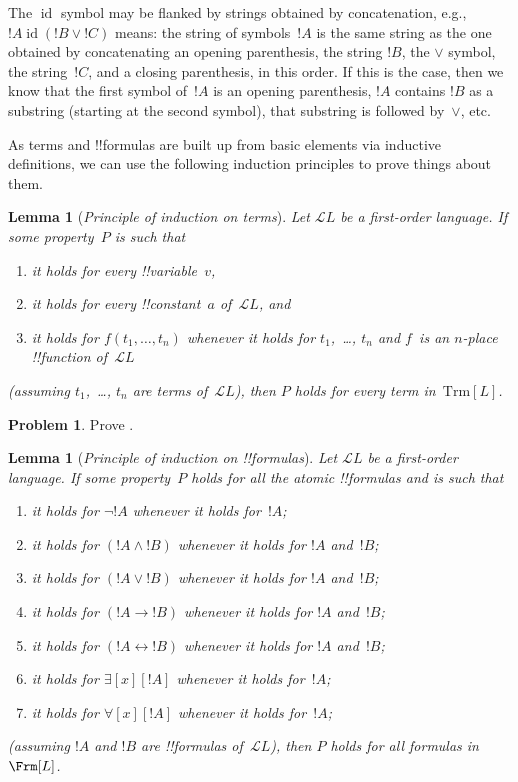 \documentclass[10pt,a4paper]{article}
\makeatletter
\theoremstyle{plain}
\newtheorem{lem}[thm]{Lemma}
\theoremstyle{definition}
\newtheorem{prob}{Problem}[section]
\theoremstyle{remark}
\newcommand*{\ollabel}[1]{\label{#1}}
\newcommand{\olref}{\@ifnextchar[{\olref@i}{\olref@final}}
\def\olref@i[#1]{\@ifnextchar[{\olref@ii}{\olref@final}}
\def\olref@ii[#1]{\@ifnextchar[{\olref@iii}{\olref@final}}
\def\olref@iii[#1]{\olref@final}
\def\olref@final#1{\ref{#1}}
\providecommand{\lif}{\mathbin{\rightarrow}}
\providecommand{\lforall}{\mathord{\forall}}
\providecommand{\lexists}{\mathord{\exists}}
\providecommand{\Lang}{\ensuremath{\mathcal{L}}}
\providecommand{\tagitem}[1]{\item[#1]}
\providecommand{\liff}{\mathbin{\leftrightarrow}}
\providecommand{\Trm}{\mathrm{Trm}}
\providecommand{\ident}{\operatorname{id}}
\makeatother
\begin{document}
The $\ident$ symbol may be flanked by strings obtained by
concatenation, e.g., $!A \ident (!B \lor !C)$ means: the string of
symbols~$!A$ is the same string as the one obtained by concatenating
an opening parenthesis, the string $!B$, the $\lor$ symbol, the
string~$!C$, and a closing parenthesis, in this order. If this is the
case, then we know that the first symbol of~$!A$ is an opening
parenthesis, $!A$ contains $!B$ as a substring (starting at the second
symbol), that substring is followed by~$\lor$, etc.

As terms and !!{formula}s are built up from basic elements via inductive
definitions, we can use the following induction principles to prove
things about them.

\begin{lem}[\emph{Principle of induction on terms}]
    \ollabel{lem:trmind}
    Let $\Lang L$ be a first-order language.
    If some property~$P$ is such that
    \begin{enumerate}
        \item it holds for every !!{variable}~$v$,
        \item it holds for every !!{constant}~$a$ of~$\Lang L$, and
        \item it holds for $f(t_1,\dotsc,t_n)$ whenever it holds for
        $t_1$,~\dots, $t_n$ and $f$~is an $n$-place
            !!{function} of~$\Lang L$
    \end{enumerate}
    (assuming $t_1$,~\dots, $t_n$ are terms of~$\Lang{L}$),
    then $P$ holds for every term in~$\Trm[L]$.
\end{lem}

\begin{prob}
    Prove \olref[fol][syn][frm]{lem:trmind}.
\end{prob}

\begin{lem}[\emph{Principle of induction on !!{formula}s}]
    \ollabel{thm:frmind}
    Let $\Lang L$ be a first-order language.
    If some property~$P$ holds for all the atomic !!{formula}s
    and is such that
    \begin{enumerate}
        \tagitem{prvNot}{it holds for $\lnot !A$ whenever it
            holds for~$!A$;}{}
        \tagitem{prvAnd}{it holds for $(!A \land !B)$
            whenever it holds for $!A$ and~$!B$;}{}
        \tagitem{prvOr}{it holds for $(!A \lor !B)$
            whenever it holds for $!A$ and~$!B$;}{}
        \tagitem{prvIf}{it holds for $(!A \lif !B)$
            whenever it holds for $!A$ and~$!B$;}{}
        \tagitem{prvIff}{it holds for $(!A \liff !B)$
            whenever it holds for $!A$ and~$!B$;}{}
        \tagitem{prvEx}{it holds for $\lexists[x][!A]$
            whenever it holds for~$!A$;}{}
        \tagitem{prvAll}{it holds for $\lforall[x][!A]$
            whenever it holds for~$!A$;}{}
  \end{enumerate}
  (assuming $!A$ and $!B$ are !!{formula}s of~$\Lang{L}$),
  then $P$ holds for all formulas in~$\Frm[L]$.
\end{lem}
\end{document}
